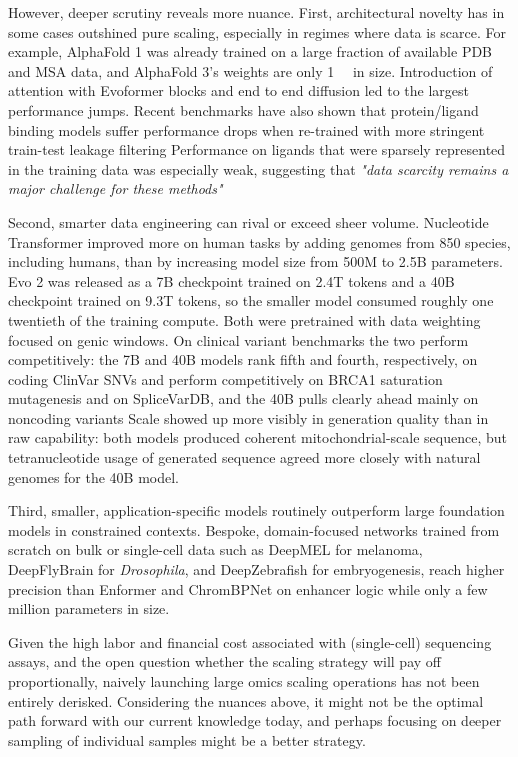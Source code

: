 However, deeper scrutiny reveals more nuance. First, architectural novelty has in some cases outshined pure scaling, especially in regimes where data is scarce. For example, AlphaFold 1 was already trained on a large fraction of available PDB and MSA data, and AlphaFold 3's weights are only \SI{1}{\giga\byte} in size. Introduction of attention with Evoformer blocks and end to end diffusion led to the largest performance jumps. Recent benchmarks have also shown that protein/ligand binding models suffer performance drops when re-trained with more stringent train-test leakage filtering Performance on ligands that were sparsely represented in the training data was especially weak, suggesting that \textit{"data scarcity remains a major challenge for these methods"}

Second, smarter data engineering can rival or exceed sheer volume. Nucleotide Transformer improved more on human tasks by adding genomes from 850 species, including humans, than by increasing model size from 500M to 2.5B parameters. Evo 2 was released as a 7B checkpoint trained on 2.4T tokens and a 40B checkpoint trained on 9.3T tokens, so the smaller model consumed roughly one twentieth of the training compute. Both were pretrained with data weighting focused on genic windows. On clinical variant benchmarks the two perform competitively: the 7B and 40B models rank fifth and fourth, respectively, on coding ClinVar SNVs and perform competitively on BRCA1 saturation mutagenesis and on SpliceVarDB, and the 40B pulls clearly ahead mainly on noncoding variants Scale showed up more visibly in generation quality than in raw capability: both models produced coherent mitochondrial-scale sequence, but tetranucleotide usage of generated sequence agreed more closely with natural genomes for the 40B model.

Third, smaller, application-specific models routinely outperform large foundation models in constrained contexts. Bespoke, domain-focused networks trained from scratch on bulk or single-cell data such as DeepMEL for melanoma, DeepFlyBrain for \textit{Drosophila}, and DeepZebrafish for embryogenesis, reach higher precision than Enformer and ChromBPNet on enhancer logic while only a few million parameters in size.

Given the high labor and financial cost associated with (single-cell) sequencing assays, and the open question whether the scaling strategy will pay off proportionally, naively launching large omics scaling operations has not been entirely derisked. Considering the nuances above, it might not be the optimal path forward with our current knowledge today, and perhaps focusing on deeper sampling of individual samples might be a better strategy.

